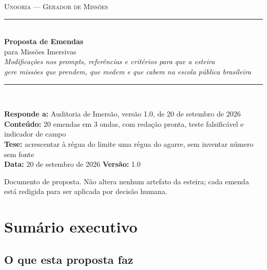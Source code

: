 \documentclass[11pt,a4paper]{article}
\begin{document}
\begin{titlepage}
\centering
\vspace*{2.5cm}

{\color{SteelBlue}\large\scshape Unooria --- Gerador de Missões}\\[0.4cm]
{\color{BorderGray}\rule{0.8\textwidth}{1.2pt}}\\[1.0cm]

{\Huge\bfseries\color{NavyBlue} Proposta de Emendas}\\[0.5cm]
{\LARGE\color{NavyBlue} para Missões Imersivas}\\[1.2cm]

{\large\itshape Modificações nos prompts, referências e critérios para que a esteira}\\[0.2cm]
{\large\itshape gere missões que prendem, que medem e que cabem na escola pública brasileira}\\[1.5cm]

{\color{BorderGray}\rule{0.8\textwidth}{0.6pt}}\\[1.0cm]

\begin{minipage}{0.8\textwidth}
\centering
\small
\textbf{Responde a:} Auditoria de Imersão, versão 1.0, de 20 de setembro de 2026\\
\textbf{Conteúdo:} 20 emendas em 3 ondas, com redação pronta, teste falsificável e indicador de campo\\
\textbf{Tese:} acrescentar à régua do limite uma régua do agarre, sem inventar número sem fonte\\[0.6cm]
\textbf{Data:} 20 de setembro de 2026 \quad\textbullet\quad \textbf{Versão:} 1.0
\end{minipage}

\vfill
{\small\color{Charcoal} Documento de proposta. Não altera nenhum artefato da esteira; cada emenda
está redigida para ser aplicada por decisão humana.}
\end{titlepage}

\tableofcontents
\newpage

\section{Sumário executivo}

\subsection{O que esta proposta faz}
\end{document}
